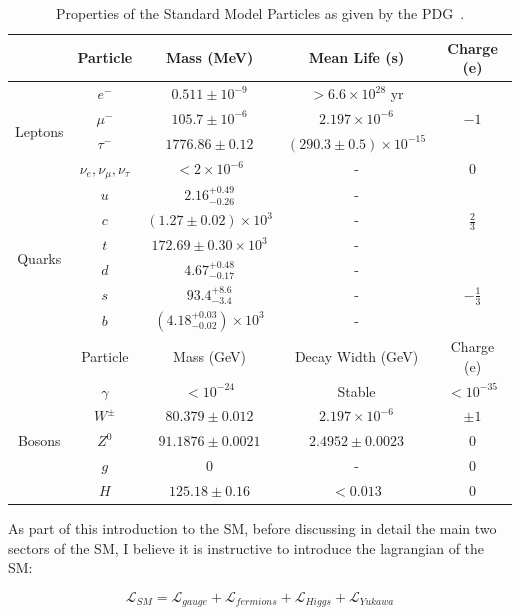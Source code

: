 \begin{table}[h]
    \centering
    \begin{tabular}{ccccc}
    \toprule
    & Particle & Mass (MeV) & Mean Life (s) & Charge (e) \\
    \midrule
    \multirow{4}{*}{Leptons} & $e^-$ & $0.511 \pm 10^{-9}$ & $> 6.6 \times 10^{28}$ yr &  \\
    & $\mu^-$ & $105.7 \pm 10^{-6}$ & $2.197 \times 10^{-6}$ & $-1$  \\
    & $\tau^-$ & $1776.86 \pm 0.12$ & $(290.3 \pm 0.5) \times 10^{-15}$ &  \\
    & $\nu_e, \nu_{\mu}, \nu_{\tau}$ & $< 2 \times 10^{-6}$ & - & $0$  \\
    \midrule
    \multirow{6}{*}{Quarks} & $u$ & $2.16^{+0.49}_{-0.26}$ & - &   \\
    & $c$ & $(1.27 \pm 0.02) \times 10^3$ & - & $\frac{2}{3}$  \\
    & $t$ & $172.69 \pm 0.30 \times 10^3$ & - &   \\
    & $d$ & $4.67^{+0.48}_{-0.17}$ & - &    \\
    & $s$ & $93.4^{+8.6}_{-3.4}$ & - & $-\frac{1}{3}$  \\
    & $b$ & $(4.18^{+0.03}_{-0.02}) \times 10^3$ & - &   \\
    \midrule
    & Particle & Mass (GeV) & Decay Width (GeV) & Charge (e) \\
    \midrule
    \multirow{5}{*}{Bosons} & $\gamma$ & $< 10^{-24}$ & Stable & $< 10^{-35}$  \\
    & $W^{\pm}$ & $80.379 \pm 0.012$ & $2.197 \times 10^{-6}$ & $\pm 1$  \\
    & $Z^0$ & $91.1876 \pm 0.0021$ & $2.4952 \pm 0.0023$ & $0$  \\
    & $g$ & $0$ & - & $0$  \\
    & $H$ & $125.18 \pm 0.16$ & $< 0.013$ & $0$  \\
    \bottomrule
    \end{tabular}
    \caption{Properties of the Standard Model Particles as given by the PDG~\cite{pdg}.}
    \label{table:pdg-table}
\end{table}

As part of this introduction to the SM, before discussing in detail the main 
two sectors of the SM, I believe it is instructive to introduce the lagrangian of the SM:

\begin{equation}
    \mathcal{L}_{SM} = \mathcal{L}_{gauge} + \mathcal{L}_{fermions} + \mathcal{L}_{Higgs} + \mathcal{L}_{Yukawa}
\end{equation}

